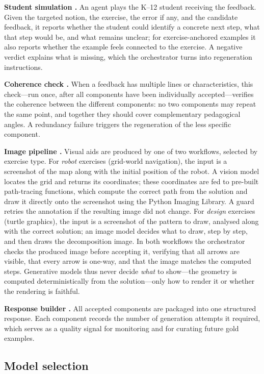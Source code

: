 \documentclass[10pt]{article}
\newcommand{\cmp}[1]{\raisebox{0.5pt}{\textcircled{\raisebox{-0.9pt}{\scriptsize #1}}}}
\begin{document}
\textbf{Student simulation \cmp{6}.} An agent plays the K--12 student receiving the feedback. Given the targeted notion, the exercise, the error if any, and the candidate feedback, it reports whether the student could identify a concrete next step, what that step would be, and what remains unclear; for exercise-anchored examples it also reports whether the example feels connected to the exercise. A negative verdict explains what is missing, which the orchestrator turns into regeneration instructions.

\textbf{Coherence check \cmp{7}.} When a feedback has multiple lines or characteristics, this check---run once, after all components have been individually accepted---verifies the coherence between the different components: no two components may repeat the same point, and together they should cover complementary pedagogical angles. A redundancy failure triggers the regeneration of the less specific component.

\textbf{Image pipeline \cmp{8}.} Visual aids are produced by one of two workflows, selected by exercise type. For \emph{robot} exercises (grid-world navigation), the input is a screenshot of the map along with the initial position of the robot. A vision model locates the grid and returns its coordinates; these coordinates are fed to pre-built path-tracing functions, which compute the correct path from the solution and draw it directly onto the screenshot using the Python Imaging Library. A guard retries the annotation if the resulting image did not change. For \emph{design} exercises (turtle graphics), the input is a screenshot of the pattern to draw, analysed along with the correct solution; an image model decides what to draw, step by step, and then draws the decomposition image. In both workflows the orchestrator checks the produced image before accepting it, verifying that all arrows are visible, that every arrow is one-way, and that the image matches the computed steps. Generative models thus never decide \emph{what} to show---the geometry is computed deterministically from the solution---only how to render it or whether the rendering is faithful.

\textbf{Response builder \cmp{9}.} All accepted components are packaged into one structured response. Each component records the number of generation attempts it required, which serves as a quality signal for monitoring and for curating future gold examples.

\subsection{Model selection}
\label{sec:models}
\end{document}
